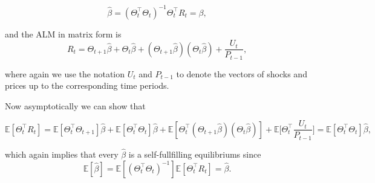 \documentclass[11pt]{article}
\begin{document}
\begin{equation}
    \hat{\beta} = (\Theta_t^\top \Theta_t)^{-1} \Theta_t^\top R_{t} = \beta,
\end{equation}

and the ALM in matrix form is
\begin{equation}
    R_t = \Theta_{t+1} \hat{\beta}+ \Theta_t \hat{\beta}+ (\Theta_{t+1} \hat{\beta})(\Theta_t \hat{\beta}) + \frac{U_t}{P_{t-1}},
\end{equation}

where again we use the notation $U_t$ and $P_{t-1}$ to denote the vectors of shocks and prices up to the corresponding time periods.

Now asymptotically we can show that 

\begin{equation}
    \mathbb{E}[\Theta_t^\top R_t] = \mathbb{E}[\Theta_t^\top \Theta_{t+1}] \hat{\beta}+ \mathbb{E}[\Theta_t^\top \Theta_t] \hat{\beta} + \mathbb{E}[\Theta_t^\top (\Theta_{t+1} \hat{\beta})(\Theta_t \hat{\beta})] + \mathbb{E}\Big[\Theta_t^\top \frac{U_t}{P_{t-1}}\Big] = \mathbb{E}[\Theta_t^\top \Theta_t] \hat{\beta},
\end{equation}


which again implies that every $\hat{\beta}$ is a self-fullfilling equilibriums since
\begin{equation}
    \mathbb{E}[\hat{\beta}] = \mathbb{E}[(\Theta_t^\top \Theta_t)^{-1}] \mathbb{E}[\Theta_t^\top R_{t}] = \hat{\beta}.
\end{equation}
\end{document}
